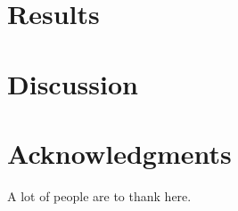 \documentclass[a4paper,12pt]{article}
\begin{document}
\section*{Results}




\section*{Discussion}



\section*{Acknowledgments}

A lot of people are to thank here.


\newpage



\end{document}
